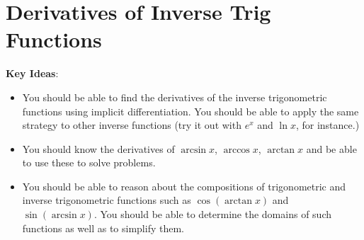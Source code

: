 \documentclass[main]{subfiles}
\begin{document}
\ifSubfilesClassLoaded{%
  \chaptermark{\chapterthree}
}{}

\section{Derivatives of Inverse Trig Functions} \label{ws3-5}

\begin{problemonly}
    \begin{framed}

\textbf{Key Ideas}:

\begin{itemize}[topsep=0pt,partopsep=0pt,parsep=8pt,itemsep=0pt]

\item You should be able to find the derivatives of the inverse
  trigonometric functions using implicit differentiation.  You should be
  able to apply the same strategy to other inverse functions (try it out
  with $e^x$ and $\ln x$, for instance.)

\item You should know the derivatives of $\arcsin x$, $\arccos x$,
  $\arctan x$ and be able to use these to solve problems. 

\item You should be able to reason about the compositions of trigonometric
  and inverse trigonometric functions such as $\cos(\arctan x)$ and
  $\sin(\arcsin x)$. You should be able to determine the domains of such
  functions as well as to simplify them.

\end{itemize}
\end{framed}
\end{problemonly}
\end{document}
